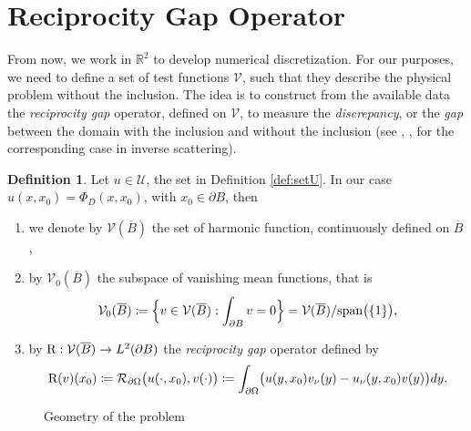 \documentclass[10pt, a4paper, twoside, openright]{book}
\theoremstyle{definition}
\newtheorem{definition}[subsection]{Definition}
\theoremstyle{plain}
\theoremstyle{plain}
\theoremstyle{plain}
\theoremstyle{plain}
\theoremstyle{plain}
\theoremstyle{plain}
\theoremstyle{plain}
\theoremstyle{plain}
\begin{document}
\section{Reciprocity Gap Operator}
From now, we work in $\mathbb{R}^2$ to develop numerical discretization. 
For our purposes, we need to define a set of test functions $\mathcal{V}$, such that 
they describe the physical problem without the inclusion. The idea is to construct from the available 
data the \emph{reciprocity gap} operator, defined on $\mathcal{V}$, to measure the \emph{discrepancy}, or the \emph{gap} 
between the domain with the inclusion and without the inclusion 
(see \cite{colton-haddar:rg}, \cite{dicristo-sun:2006}, \cite{dicristo-sun:2007} 
for the corresponding case in inverse scattering).
\begin{definition}
\label{def:setV}
Let $u\in\mathcal{U}$, the set in Definition \ref{def:setU}. In our case $u(x,x_0)=\Phi_D(x,x_0)$, with $x_0 \in \partial B$, then
\begin{enumerate}
 \item we denote by $\mathcal{V}(\overline{B})$ the set of harmonic function, continuously defined on $\overline{B}$,
 \item by $\mathcal{V}_0(\overline{B})$ the subspace of vanishing mean functions, that is
 \begin{equation}
  \mathcal{V}_0(\overline{B})\coloneqq\Bigl\{v\in\mathcal{V}(\overline{B}):\int_{\partial B} v = 0\Bigr\}=\mathcal{V}(\overline{B})/\textup{span}\bigl(\{1\}\bigr),
 \end{equation}
 \item by $\textup{R} : \mathcal{V}(\overline{B})\to L^2(\partial B)$ the \emph{reciprocity gap} operator defined by
\begin{equation}
 \textup{R}(v)(x_0)\coloneqq \mathcal{R}_{\partial\Omega}\bigl(u(\cdot,x_0),v(\cdot)\bigr)\coloneqq \int_{\partial \Omega}\bigl(u(y,x_0)v_\nu (y) - u_\nu(y,x_0)v(y)\bigr)dy.
\end{equation}
\end{enumerate}
\end{definition}


\begin{figure}[]
\begin{center}
\end{center}
\caption{Geometry of the problem}
\end{figure}
\end{document}
